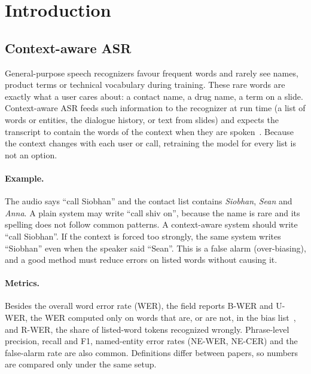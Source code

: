 \section{Introduction}

\subsection{Context-aware ASR}
General-purpose speech recognizers favour frequent words and rarely see names, product terms or technical
vocabulary during training. These rare words are exactly what a user cares about: a contact name,
a drug name, a term on a slide. Context-aware ASR feeds such information to the recognizer at run time
(a list of words or entities, the dialogue history, or text from slides) and expects the transcript
to contain the words of the context when they are spoken~\cite{pundak2018,zhao2019}.
Because the context changes with each user or call, retraining the model for every list is not an option.

\paragraph{Example.} The audio says ``call Siobhan'' and the contact list contains \emph{Siobhan}, \emph{Sean} and \emph{Anna}.
A plain system may write ``call shiv on'', because the name is rare and its spelling does not follow common patterns.
A context-aware system should write ``call Siobhan''. If the context is forced too strongly, the same system writes
``Siobhan'' even when the speaker said ``Sean''. This is a false alarm (over-biasing), and a good method must
reduce errors on listed words without causing it.

\paragraph{Metrics.} Besides the overall word error rate (WER), the field reports
B-WER and U-WER, the WER computed only on words that are, or are not, in the bias list~\cite{le2021triebias},
and R-WER, the share of listed-word tokens recognized wrongly. Phrase-level precision, recall and F1,
named-entity error rates (NE-WER, NE-CER) and the false-alarm rate are also common.
Definitions differ between papers, so numbers are compared only under the same setup.

